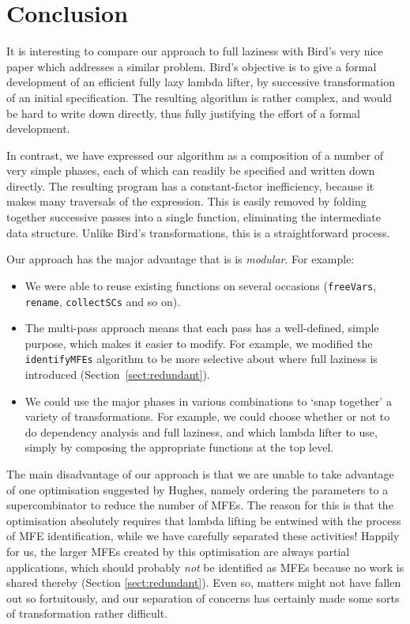 \section{Conclusion}

It is interesting to compare our approach to full laziness
with Bird's very nice paper
\cite{Bird} which addresses a similar
problem.  Bird's objective is to give a formal development of an
efficient fully lazy lambda lifter, by successive transformation of an
initial specification.  The resulting algorithm is rather complex, and
would be hard to write down directly, thus fully justifying the effort
of a formal development.

In contrast, we have expressed our algorithm as a composition of a
number of very simple phases, each of which can readily be specified
and written down directly.  The resulting program has a
constant-factor inefficiency, because it makes many traversals of the
expression.  This is easily removed by folding together successive
passes into a single function, eliminating the intermediate data
structure.  Unlike Bird's transformations, this is a straightforward
process.

Our approach has the major advantage that is is {\em modular}.
For example:
\begin{itemize}
\item
We were able to reuse existing functions on several occasions
(\mbox{\tt freeVars}, \mbox{\tt rename}, \mbox{\tt collectSCs} and so on).
\item
The multi-pass approach means that each pass has a well-defined, simple
purpose, which makes it easier to modify.
For example, we modified the \mbox{\tt identifyMFEs} algorithm to be more
selective about where full laziness is introduced
(Section~\ref{sect:redundant}).
\item
We could use the major phases in various combinations to
`snap together' a variety of transformations.
For example, we could choose whether or not to do dependency analysis
and
full laziness, and which lambda lifter to use, simply by composing
the appropriate functions at the top level.
\end{itemize}
The main disadvantage of our approach is that we are unable to take
advantage of one optimisation suggested by Hughes, namely ordering the
parameters to a supercombinator to reduce the number of MFEs.  The
reason for this is that the optimisation absolutely requires that
lambda lifting be entwined with the process of MFE identification,
while we have carefully separated these activities!  Happily for us,
the larger MFEs created by this optimisation are always partial
applications, which should probably {\em not\/} be identified as MFEs
because no work is shared thereby (Section \ref{sect:redundant}).  Even so,
matters might not have fallen out so fortuitously, and our separation
of concerns has certainly made some sorts of transformation rather
difficult.

\theendnotes

